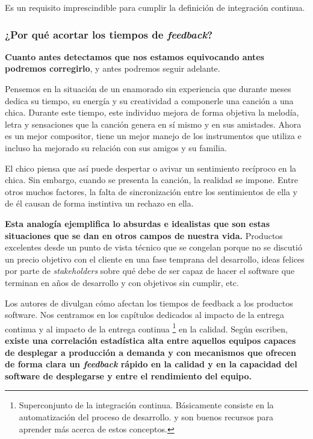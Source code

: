 Es un requisito imprescindible para cumplir la definición de integración continua.
\cite{minimumViableCD}

\subsubsection{¿Por qué acortar los tiempos de \textit{feedback}?}

\textbf{Cuanto antes detectamos que nos estamos equivocando
antes podremos corregirlo}, y antes podremos seguir adelante.

Pensemos en la situación de un enamorado sin experiencia que durante meses dedica su
tiempo, su energía y su creatividad a componerle una canción a una chica.
Durante este tiempo, este individuo mejora de forma objetiva la
melodía, letra y sensaciones que la canción genera en sí mismo
y en sus amistades. Ahora es un mejor compositor, tiene un mejor manejo
de los instrumentos que utiliza e incluso ha mejorado su
relación con sus amigos y su familia.

El chico piensa que así puede despertar o avivar un sentimiento recíproco
en la chica. Sin embargo, cuando se presenta la canción,
la realidad se impone. Entre otros muchos factores,
la falta de sincronización entre los sentimientos de ella y de él causan
de forma instintiva un rechazo en ella.

\textbf{Esta analogía ejemplifica lo absurdas e idealistas
que son estas situaciones que se dan en otros campos de nuestra vida.}
Productos excelentes desde un punto de vista técnico que se
congelan porque no se discutió un precio objetivo con
el cliente en una fase temprana del desarrollo, ideas felices
por parte de \textit{stakeholders} sobre qué debe de
ser capaz de hacer el software que terminan en años de desarrollo
y con objetivos sin cumplir, etc.

Los autores de \cite{accelerate} divulgan cómo afectan los tiempos de feedback
a los productos software. Nos centramos en los capítulos dedicados al impacto de
la entrega continua y al impacto de la entrega continua%
\footnote{%
Superconjunto de la integración continua. Básicamente consiste en la automatización
del proceso de desarrollo. \cite{ModernSoftwareEngineering} y \cite{minimumViableCD}
son buenos recursos para aprender más acerca de estos conceptos.%
}%
en la calidad. Según escriben, \textbf{existe una correlación estadística alta entre aquellos
equipos capaces de desplegar a producción a demanda y 
con mecanismos que ofrecen de forma clara un \textit{feedback} rápido en
la calidad y en la capacidad del software de desplegarse y entre el rendimiento del
equipo.}

